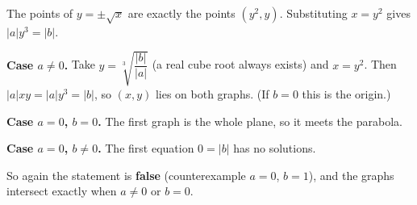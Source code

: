 The points of $y=\pm\sqrt x$ are exactly the points $(y^2,y)$. Substituting $x=y^2$ gives $|a|y^3=|b|$.

\textbf{Case $a\ne0$.} Take $y=\sqrt[3]{\dfrac{|b|}{|a|}}$ (a real cube root always exists) and $x=y^2$. Then $|a|xy=|a|y^3=|b|$, so $(x,y)$ lies on both graphs. (If $b=0$ this is the origin.)

\textbf{Case $a=0$, $b=0$.} The first graph is the whole plane, so it meets the parabola.

\textbf{Case $a=0$, $b\ne0$.} The first equation $0=|b|$ has no solutions.

So again the statement is \textbf{false} (counterexample $a=0$, $b=1$), and the graphs intersect exactly when $\boxed{a\ne0\text{ or }b=0}$.
